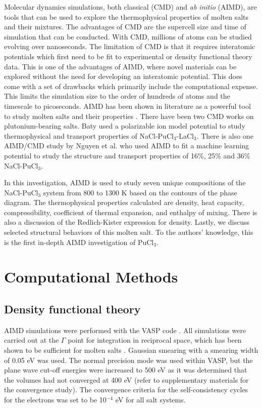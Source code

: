 \documentclass[review]{elsarticle}
\begin{document}
Molecular dynamics simulations, both classical (CMD) and \textit{ab initio} (AIMD), are tools that can be used to explore the thermophysical properties of molten salts and their mixtures. The advantages of CMD are the supercell size and time of simulation that can be conducted. With CMD, millions of atoms can be studied evolving over nanoseconds. The limitation of CMD is that it requires interatomic potentials which first need to be fit to experimental or density functional theory data. This is one of the advantages of AIMD, where novel materials can be explored without the need for developing an interatomic potential. This does come with a set of drawbacks which primarily include the computational expense. This limits the simulation size to the order of hundreds of atoms and the timescale to picoseconds. AIMD has been shown in literature as a powerful tool to study molten salts and their properties \cite{Bengston2014, duemmler_liclkcl, duemmler_naclmgcl, Song2017}. There have been two CMD works on plutonium-bearing salts. Baty \cite{baty2013molecular} used a polarizable ion model potential to study thermophysical and transport properties of NaCl-PuCl$_3$-LaCl$_3$. There is also one AIMD/CMD study by Nguyen et al. \cite{NGUYEN2023101951} who used AIMD to fit a machine learning potential to study the structure and transport properties of 16\%, 25\% and 36\% NaCl-PuCl$_3$.

In this investigation, AIMD is used to study seven unique compositions of the NaCl-PuCl$_3$ system from 800 to 1300 K based on the contours of the phase diagram. The thermophysical properties calculated are density, heat capacity, compressibility, coefficient of thermal expansion, and enthalpy of mixing. There is also a discussion of the Redlich-Kister expression for density. Lastly, we discuss selected structural behaviors of this molten salt. To the authors' knowledge, this is the first in-depth AIMD investigation of PuCl$_3$.

\section{Computational Methods}
\subsection{Density functional theory}
AIMD simulations were performed with the VASP code \cite{Kresse1993, Kresse1996, Kresse1996a}. All simulations were carried out at the $\Gamma$ point for integration in reciprocal space, which has been shown to be sufficient for molten salts \cite{NAM2015224, Bengston2014, ANDERSSON2022153836,duemmler_liclkcl,duemmler_naclmgcl}. Gaussian smearing with a smearing width of 0.05 eV was used. The normal precision mode was used within VASP, but the plane wave cut-off energies were increased to 500 eV as it was determined that the volumes had not converged at 400 eV (refer to supplementary materials for the convergence study). The convergence criteria for the self-consistency cycles for the electrons was set to be 10$^{-4}$ eV for all salt systems. 
\end{document}

